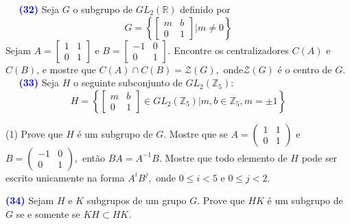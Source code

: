 \documentclass[12pt, a4paper]{article}
\newcommand{\negrito}[1]{\mbox{\boldmath{$#1$}}}
\begin{document}
\textcolor{white}{Oi}\newline\newline
\textcolor{blue}{\bf(32)}\label{ex9} Seja $G$ o subgrupo de $GL_2(\mathbb{R})$ definido por
\[
G = \left\{ \left[ \begin{array}{cc} m & b \\ 0 & 1 \end{array}   \right] \big|  m \neq 0 \right\}
\]
Sejam $A = \left[ \begin{array}{cc} 1 & 1 \\ 0 & 1 \end{array} \right]$ e $B = \left[ \begin{array}{cc} -1 & 0 \\ 0 & 1 \end{array} \right].$ Encontre os centralizadores $C(A)$ e $C(B)$, e mostre que $C(A) \cap C(B) = \mathcal{Z}(G),$ onde$\mathcal{Z}(G)$ é o centro de $G.$
\textcolor{white}{Oi}\newline\newline
\textcolor{blue}{\bf(33)}\label{ex9} Seja $H$ o seguinte subconjunto de $GL_2(\mathbb{Z}_5):$
\[
H = \left\{ \left[ \begin{array}{cc} m & b \\ 0 & 1 \end{array}   \right] \in GL_2(\mathbb{Z}_5) \big|  m,b \in \mathbb{Z}_5, m = \pm 1 \right\}
\]
\begin{tasks}[counter-format={(tsk[a])},label-width=3.6ex, label-format = {\bfseries}, column-sep = {0pt}](1)
\task[\textcolor{Floresta}{$\negrito{(a)} $}] Prove que $H$ é um subgrupo de $G.$ 
\task[\textcolor{Floresta}{$\negrito{(b)} $}] Mostre que se $A = \left( \begin{array}{cc} 1 & 1 \\ 0 & 1 \end{array} \right)$ e $B = \left( \begin{array}{cc} -1 & 0 \\ 0 & 1 \end{array} \right),$ então $BA = A^{-1}B.$
\task[\textcolor{Floresta}{$\negrito{(c)} $}] Mostre que todo elemento de $H$ pode ser escrito unicamente na forma $A^iB^j,$ onde $0 \le i < 5$ e $0 \le j < 2.$ 
\end{tasks}
\textcolor{blue}{\bf(34)}\label{ex10} Sejam $H$ e $K$ subgrupos de um grupo $G.$ Prove que $HK$ é um subgrupo de $G$ se e somente se $KH \subset HK.$
\end{document}
